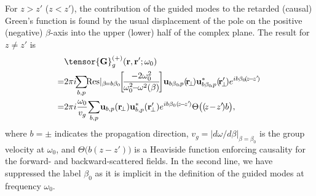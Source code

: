 \documentclass[aps,pra,twocolumn]{revtex4-1} %
\begin{document}
For $z>z'$ ($z<z'$), the contribution of the guided modes to the retarded (causal) Green's function is found by the 
usual displacement of the pole on the positive (negative) $\beta$-axis into the upper (lower) half of 
the complex plane. The result for $z \neq z'$ is \cite{manga_rao_single_2007}
	\begin{align} 
		&\tensor{\mathbf{G}}^{(+)}_g(\br,\br'; \omega_0)\nn\\ 
		\!=& 2\pi i\!\! \sum_{b,p}\!\!  {\rm Res}\vert_{\beta\! =b\beta_0} \!\!
\left[\!\frac{-2 \omega_0^2 }{ \omega_0^2\!\!-\!\!\omega^2(\beta)}\!\right]\!   \mathbf{u}_{b\beta_0\!, p} 
(\!\br\!_\perp\!)\mathbf{u}^*_{b\beta_0\!, p} (\!\br_{\!\perp}^\prime\!)e^{ib \beta_0 \!(\!z\!-\!z'\!)} \nonumber \\
\!= & 2\pi i \frac{\omega_0}{v_g }\! \sum_{b,p}\! \mathbf{u}_{b, p} (\br\!_\perp)\mathbf{u}^*_{b, p} 
(\br_{\!\perp}^\prime) e^{i b\beta_0(\!z\!-\!z'\!)} \Theta \big( (\!z\!-\!z'\!)b \big), \label{Eq::GreensGuided}
	\end{align}
where $b=\pm$ indicates the propagation direction, $v_g= \vert d\omega/d\beta \vert_{\beta=\beta_0}$ is the group velocity at $\omega_0$, and $\Theta \big( b(z-z') \big)$ is a Heaviside function enforcing causality for the forward- and backward-scattered fields. In the second line, we have suppressed the label $\beta_0$ as it is implicit in the definition of the guided modes at frequency $\omega_0$. 
\end{document}
